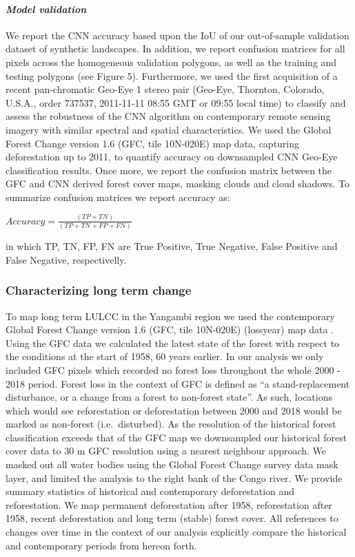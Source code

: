 \documentclass[remote sensing,article,submit,moreauthors,pdftex]{mdpi}
\begin{document}
\hypertarget{model-validation}{%
\paragraph{\texorpdfstring{\emph{Model
validation}}{Model validation}}\label{model-validation}}

We report the CNN accuracy based upon the IoU of our out-of-sample
validation dataset of synthetic landscapes. In addition, we report
confusion matrices for all pixels across the homogeneous validation
polygons, as well as the training and testing polygons (see Figure 5).
Furthermore, we used the first acquisition of a recent pan-chromatic
Geo-Eye 1 stereo pair (Geo-Eye, Thornton, Colorado, U.S.A., order
737537, 2011-11-11 08:55 GMT or 09:55 local time) to classify and assess
the robustness of the CNN algorithm on contemporary remote sensing
imagery with similar spectral and spatial characteristics. We used the
Global Forest Change version 1.6 (GFC, tile 10N-020E) \citep{hansen2013}
map data, capturing deforestation up to 2011, to quantify accuracy on
downsampled CNN Geo-Eye classification results. Once more, we report the
confusion matrix between the GFC and CNN derived forest cover maps,
masking clouds and cloud shadows. To summarize confusion matrices we
report accuracy as:

\(Accuracy = \frac{(TP + TN)}{(TP + TN + FP + FN)}\)

in which TP, TN, FP, FN are True Positive, True Negative, False Positive
and False Negative, respectivelly.

\hypertarget{characterizing-long-term-change}{%
\subsubsection{Characterizing long term
change}\label{characterizing-long-term-change}}

To map long term LULCC in the Yangambi region we used the contemporary
Global Forest Change version 1.6 (GFC, tile 10N-020E) (lossyear) map
data \citep{hansen2013}. Using the GFC data we calculated the latest
state of the forest with respect to the conditions at the start of 1958,
60 years earlier. In our analysis we only included GFC pixels which
recorded no forest loss throughout the whole 2000 - 2018 period. Forest
loss in the context of GFC is defined as ``a stand-replacement
disturbance, or a change from a forest to non-forest state''. As such,
locations which would see reforestation or deforestation between 2000
and 2018 would be marked as non-forest (i.e.~disturbed). As the
resolution of the historical forest classification exceeds that of the
GFC map we downsampled our historical forest cover data to 30 m GFC
resolution using a nearest neighbour approach. We masked out all water
bodies using the Global Forest Change survey data mask layer, and
limited the analysis to the right bank of the Congo river. We provide
summary statistics of historical and contemporary deforestation and
reforestation. We map permanent deforestation after 1958, reforestation
after 1958, recent deforestation and long term (stable) forest cover.
All references to changes over time in the context of our analysis
explicitly compare the historical and contemporary periods from hereon
forth.
\end{document}
